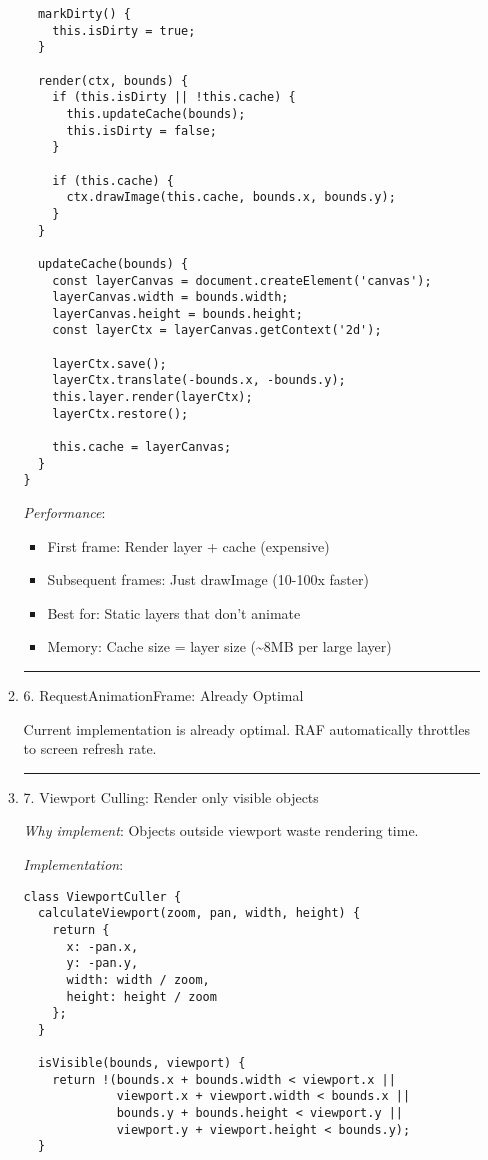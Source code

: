 \documentclass[11pt]{article}
\begin{document}
\begin{enumerate}
\begin{enumerate}
\begin{verbatim}
  markDirty() {
    this.isDirty = true;
  }
  
  render(ctx, bounds) {
    if (this.isDirty || !this.cache) {
      this.updateCache(bounds);
      this.isDirty = false;
    }
    
    if (this.cache) {
      ctx.drawImage(this.cache, bounds.x, bounds.y);
    }
  }
  
  updateCache(bounds) {
    const layerCanvas = document.createElement('canvas');
    layerCanvas.width = bounds.width;
    layerCanvas.height = bounds.height;
    const layerCtx = layerCanvas.getContext('2d');
    
    layerCtx.save();
    layerCtx.translate(-bounds.x, -bounds.y);
    this.layer.render(layerCtx);
    layerCtx.restore();
    
    this.cache = layerCanvas;
  }
}
\end{verbatim}

\emph{Performance}:
\begin{itemize}
\item First frame: Render layer + cache (expensive)
\item Subsequent frames: Just drawImage (10-100x faster)
\item Best for: Static layers that don't animate
\item Memory: Cache size = layer size (\textasciitilde{}8MB per large layer)
\end{itemize}

\noindent\rule{\textwidth}{0.5pt}
\item 6. RequestAnimationFrame: Already Optimal
\label{sec:org35a7aad}

Current implementation is already optimal. RAF automatically throttles to screen refresh rate.

\noindent\rule{\textwidth}{0.5pt}
\item 7. Viewport Culling: Render only visible objects
\label{sec:orgd92c9bd}

\emph{Why implement}: Objects outside viewport waste rendering time.

\emph{Implementation}:
\begin{verbatim}
class ViewportCuller {
  calculateViewport(zoom, pan, width, height) {
    return {
      x: -pan.x,
      y: -pan.y,
      width: width / zoom,
      height: height / zoom
    };
  }
  
  isVisible(bounds, viewport) {
    return !(bounds.x + bounds.width < viewport.x ||
             viewport.x + viewport.width < bounds.x ||
             bounds.y + bounds.height < viewport.y ||
             viewport.y + viewport.height < bounds.y);
  }
  

\end{verbatim}
\end{enumerate}
\end{enumerate}
\end{document}
